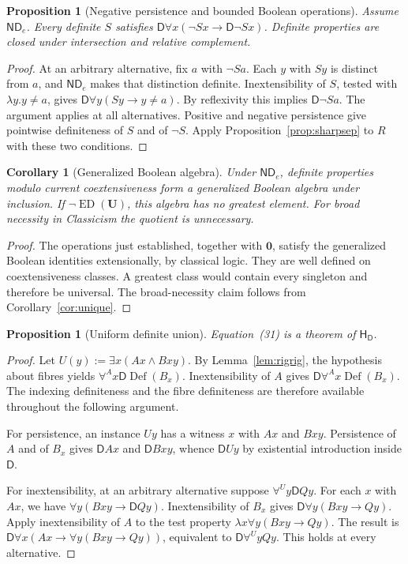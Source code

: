 \documentclass[11pt]{article}
\newtheorem{proposition}[theorem]{Proposition}
\newtheorem{corollary}[theorem]{Corollary}
\theoremstyle{definition}
\newcommand{\D}{\mathsf D}
\newcommand{\ED}{\operatorname{ED}}
\newcommand{\Def}{\operatorname{Def}}
\newcommand{\HD}{\mathsf H_{\D}}
\newcommand{\U}{\mathbf U}
\newcommand{\Z}{\mathbf 0}
\newcommand{\ND}{\mathsf{ND}_e}
\numberwithin{equation}{section}
\begin{document}
\begin{proposition}[Negative persistence and bounded Boolean operations]\label{prop:negative}
Assume $\ND$. Every definite $S$ satisfies $\D\forall x(\neg Sx\rightarrow\D\neg Sx)$. Definite properties are closed under intersection and relative complement.
\end{proposition}
\begin{proof}
At an arbitrary alternative, fix $a$ with $\neg Sa$. Each $y$ with $Sy$ is distinct from $a$, and $\ND$ makes that distinction definite. Inextensibility of $S$, tested with $\lambda y.y\ne a$, gives $\D\forall y(Sy\rightarrow y\ne a)$. By reflexivity this implies $\D\neg Sa$. The argument applies at all alternatives. Positive and negative persistence give pointwise definiteness of $S$ and of $\neg S$. Apply Proposition~\ref{prop:sharpsep} to $R$ with these two conditions.
\end{proof}

\begin{corollary}[Generalized Boolean algebra]
Under $\ND$, definite properties modulo current coextensiveness form a generalized Boolean algebra under inclusion. If $\neg\ED(\U)$, this algebra has no greatest element. For broad necessity in Classicism the quotient is unnecessary.
\end{corollary}
\begin{proof}
The operations just established, together with $\Z$, satisfy the generalized Boolean identities extensionally, by classical logic. They are well defined on coextensiveness classes. A greatest class would contain every singleton and therefore be universal. The broad-necessity claim follows from Corollary~\ref{cor:unique}.
\end{proof}

\begin{proposition}[Uniform definite union]\label{prop:rigunion}
Equation~\textup{(31)} is a theorem of $\HD$.
\end{proposition}
\begin{proof}
Let $U(y):=\exists x(Ax\wedge Bxy)$. By Lemma~\ref{lem:rigrig}, the hypothesis about fibres yields $\forall^Ax\D\Def(B_x)$. Inextensibility of $A$ gives $\D\forall^Ax\Def(B_x)$. The indexing definiteness and the fibre definiteness are therefore available throughout the following argument.

For persistence, an instance $Uy$ has a witness $x$ with $Ax$ and $Bxy$. Persistence of $A$ and of $B_x$ gives $\D Ax$ and $\D Bxy$, whence $\D Uy$ by existential introduction inside $\D $.

For inextensibility, at an arbitrary alternative suppose $\forall^Uy\D Qy$. For each $x$ with $Ax$, we have $\forall y(Bxy\rightarrow\D Qy)$. Inextensibility of $B_x$ gives $\D\forall y(Bxy\rightarrow Qy)$. Apply inextensibility of $A$ to the test property $\lambda x\forall y(Bxy\rightarrow Qy)$. The result is $\D\forall x(Ax\rightarrow\forall y(Bxy\rightarrow Qy))$, equivalent to $\D\forall^UyQy$. This holds at every alternative.
\end{proof}
\end{document}
